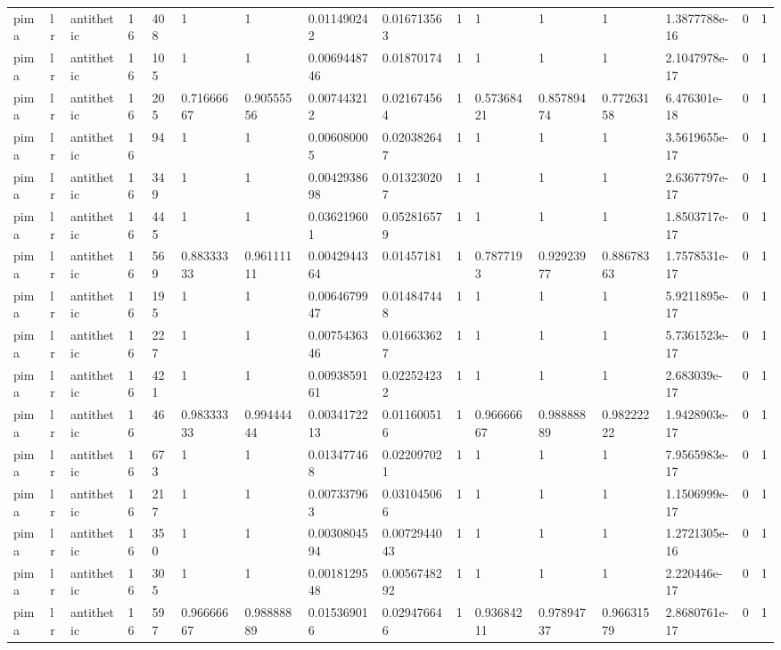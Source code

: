 \begin{tabular}{llllllllllllllll}
pima & lr & antithetic & 16 & 408 & 1 & 1 & 0.011490242 & 0.016713563 & 1 & 1 & 1 & 1 & 1.3877788e-16 & 0 & 1 \\
pima & lr & antithetic & 16 & 105 & 1 & 1 & 0.0069448746 & 0.01870174 & 1 & 1 & 1 & 1 & 2.1047978e-17 & 0 & 1 \\
pima & lr & antithetic & 16 & 205 & 0.71666667 & 0.90555556 & 0.007443212 & 0.021674564 & 1 & 0.57368421 & 0.85789474 & 0.77263158 & 6.476301e-18 & 0 & 1 \\
pima & lr & antithetic & 16 & 94 & 1 & 1 & 0.006080005 & 0.020382647 & 1 & 1 & 1 & 1 & 3.5619655e-17 & 0 & 1 \\
pima & lr & antithetic & 16 & 349 & 1 & 1 & 0.0042938698 & 0.013230207 & 1 & 1 & 1 & 1 & 2.6367797e-17 & 0 & 1 \\
pima & lr & antithetic & 16 & 445 & 1 & 1 & 0.036219601 & 0.052816579 & 1 & 1 & 1 & 1 & 1.8503717e-17 & 0 & 1 \\
pima & lr & antithetic & 16 & 569 & 0.88333333 & 0.96111111 & 0.0042944364 & 0.01457181 & 1 & 0.7877193 & 0.92923977 & 0.88678363 & 1.7578531e-17 & 0 & 1 \\
pima & lr & antithetic & 16 & 195 & 1 & 1 & 0.0064679947 & 0.014847448 & 1 & 1 & 1 & 1 & 5.9211895e-17 & 0 & 1 \\
pima & lr & antithetic & 16 & 227 & 1 & 1 & 0.0075436346 & 0.016633627 & 1 & 1 & 1 & 1 & 5.7361523e-17 & 0 & 1 \\
pima & lr & antithetic & 16 & 421 & 1 & 1 & 0.0093859161 & 0.022524232 & 1 & 1 & 1 & 1 & 2.683039e-17 & 0 & 1 \\
pima & lr & antithetic & 16 & 46 & 0.98333333 & 0.99444444 & 0.0034172213 & 0.011600516 & 1 & 0.96666667 & 0.98888889 & 0.98222222 & 1.9428903e-17 & 0 & 1 \\
pima & lr & antithetic & 16 & 673 & 1 & 1 & 0.013477468 & 0.022097021 & 1 & 1 & 1 & 1 & 7.9565983e-17 & 0 & 1 \\
pima & lr & antithetic & 16 & 217 & 1 & 1 & 0.007337963 & 0.031045066 & 1 & 1 & 1 & 1 & 1.1506999e-17 & 0 & 1 \\
pima & lr & antithetic & 16 & 350 & 1 & 1 & 0.0030804594 & 0.0072944043 & 1 & 1 & 1 & 1 & 1.2721305e-16 & 0 & 1 \\
pima & lr & antithetic & 16 & 305 & 1 & 1 & 0.0018129548 & 0.0056748292 & 1 & 1 & 1 & 1 & 2.220446e-17 & 0 & 1 \\
pima & lr & antithetic & 16 & 597 & 0.96666667 & 0.98888889 & 0.015369016 & 0.029476646 & 1 & 0.93684211 & 0.97894737 & 0.96631579 & 2.8680761e-17 & 0 & 1 \\

\end{tabular}
